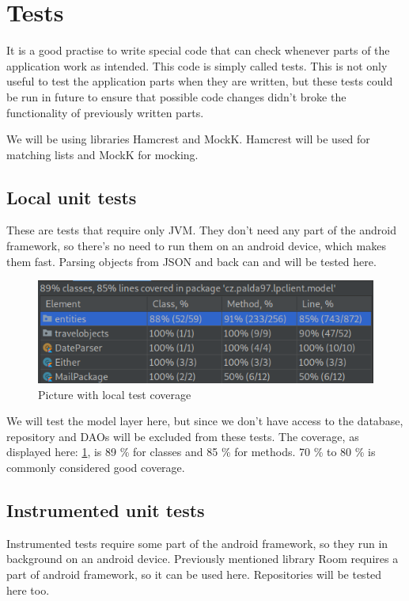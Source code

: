 \section{Tests}
It is a good practise to write special code that can check whenever parts of the application work as intended.
This code is simply called tests.
This is not only useful to test the application parts when they are written, but these tests could be run in future to ensure that possible code changes didn't broke the functionality of previously written parts.

We will be using libraries Hamcrest and MockK.
Hamcrest will be used for matching lists and MockK for mocking.

\subsection{Local unit tests}
These are tests that require only JVM.
They don't need any part of the android framework, so there's no need to run them on an android device, which makes them fast.
Parsing objects from JSON and back can and will be tested here.

\begin{figure}\centering
	\includegraphics[width=1\textwidth]{pics/coverage.png}
	\caption[Test Coverage]{Picture with local test coverage}\label{fig:coverage}
\end{figure}
We will test the model layer here, but since we don't have access to the database, repository and DAOs will be excluded from these tests.
The coverage, as displayed here: \ref{fig:coverage}, is 89 \% for classes and 85 \% for methods.
70 \% to 80 \% is commonly considered good coverage.

\subsection{Instrumented unit tests}
Instrumented tests require some part of the android framework, so they run in background on an android device.
Previously mentioned library Room requires a part of android framework, so it can be used here.
Repositories will be tested here too.

